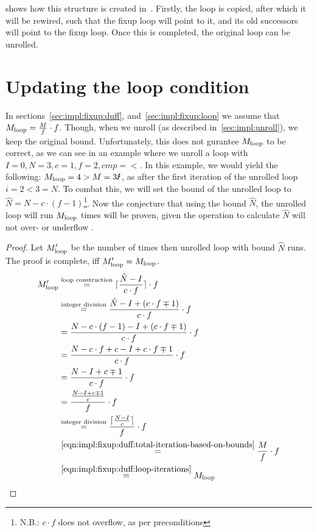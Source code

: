  shows how this structure is created in~\libFIRM.
Firstly, the loop is copied, after which it will be rewired, such that the fixup loop will point to it, and its old successors will point to the fixup loop.
Once this is completed, the original loop can be unrolled.



\section{Updating the loop condition}\label{sec:impl:fixup:header-cond}

In sections~\ref{sec:impl:fixup:duff}, and~\ref{sec:impl:fixup:loop} we assume that $M_{\text{loop}} = \frac{M}{f} \cdot f$.
Though, when we unroll (as described in~\cref{sec:impl:unroll}), we keep the original bound.
Unfortunately, this does not gurantee $M_{\text{loop}}$ to be correct, as we can see in an example where we unroll a loop with $I = 0, N = 3, c = 1, f = 2, cmp = <$.
In this example, we would yield the following: $\Mloop = 4 > M = 3 \mLightning$, as after the first iteration of the unrolled loop $i = 2 < 3 = N$.
To combat this, we will set the bound of the unrolled loop to $\hat{N} = N - c \cdot (f - 1)$\footnote{N.B.: $c \cdot f$ does not overflow, as per preconditions}.
Now the conjecture that using the bound $\hat{N}$, the unrolled loop will run $M_{\text{loop}}$ times will be proven, given the operation to calculate $\hat{N}$ will not over- or underflow .
\begin{proof}
    Let $M_{\text{loop}}'$ be the number of times then unrolled loop with bound $\hat{N}$ runs.
    The proof is complete, iff $M_{\text{loop}}' = M_{\text{loop}}$.
    \begin{align*}
        M_{\text{loop}}' &\overset{\text{loop construction}}{=} \lceil{}\frac{\hat{N} - I}{c \cdot f}\rceil{} \cdot f\\
        &\overset{\text{integer division}}{=} \frac{\hat{N} - I + (c \cdot f \mp 1)}{c \cdot f} \cdot f\\
        &= \frac{N - c \cdot (f - 1) - I + (c \cdot f \mp 1)}{c \cdot f} \cdot f\\
        &= \frac{N - c \cdot f + c - I + c \cdot f \mp 1}{c \cdot f} \cdot f\\
        &= \frac{N - I + c \mp 1}{c \cdot f} \cdot f\\
        &= \frac{\frac{N - I + c \mp 1}{c}}{f} \cdot f\\
        &\overset{\text{integer division}}{=} \frac{\lceil{}\frac{N - I}{c}\rceil{}}{f} \cdot f\\
        &\overset{\ref{eqn:impl:fixup:duff:total-iteration-based-on-bounds}}{=} \frac{M}{f} \cdot f\\
        &\overset{\ref{eqn:impl:fixup:duff:loop-iterations}}{=} M_{\text{loop}}
    \end{align*}
\end{proof}


